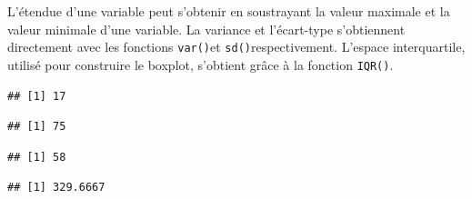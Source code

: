 \documentclass[
]{book}
\newenvironment{Shaded}{\begin{snugshade}}{\end{snugshade}}
\newcommand{\FunctionTok}[1]{\textcolor[rgb]{0.13,0.29,0.53}{\textbf{#1}}}
\newcommand{\NormalTok}[1]{#1}
\newcommand{\SpecialCharTok}[1]{\textcolor[rgb]{0.81,0.36,0.00}{\textbf{#1}}}
\begin{document}
L'étendue d'une variable peut s'obtenir en soustrayant la valeur maximale et la valeur minimale d'une variable. La variance et l'écart-type s'obtiennent directement avec les fonctions \texttt{var()}et \texttt{sd()}respectivement. L'espace interquartile, utilisé pour construire le boxplot, s'obtient grâce à la fonction \texttt{IQR()}.

\begin{Shaded}
\end{Shaded}

\begin{verbatim}
## [1] 17
\end{verbatim}

\begin{Shaded}
\end{Shaded}

\begin{verbatim}
## [1] 75
\end{verbatim}

\begin{Shaded}
\end{Shaded}

\begin{verbatim}
## [1] 58
\end{verbatim}

\begin{Shaded}
\end{Shaded}

\begin{verbatim}
## [1] 329.6667
\end{verbatim}

\begin{Shaded}
\end{Shaded}
\end{document}
